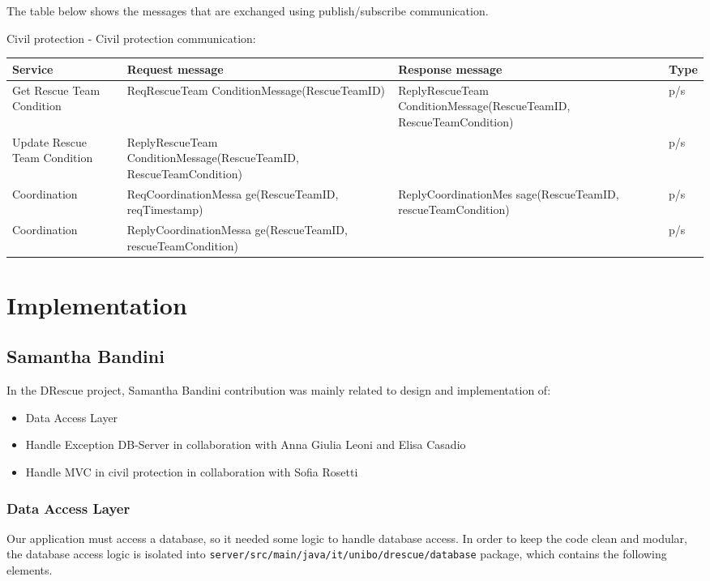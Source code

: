 \documentclass[a4paper,12pt]{report}
\begin{document}
The table below shows the messages that are exchanged using publish/subscribe communication.

Civil protection - Civil protection communication:

\begin{center}
\begin{tabular}{ |p{3.5cm}|p{4.6cm}|p{4.6cm}|p{1.3cm}| } \hline
Service 			& Request message 	& Response message		& Type 	\\
\hline
Get Rescue Team Condition	& ReqRescueTeam ConditionMessage(RescueTeamID)	& ReplyRescueTeam ConditionMessage(RescueTeamID, RescueTeamCondition) 	& p/s	\\ 
Update Rescue Team Condition	&  ReplyRescueTeam ConditionMessage(RescueTeamID, RescueTeamCondition) 	& 	& p/s	\\ 
Coordination	&  ReqCoordinationMessa ge(RescueTeamID, reqTimestamp) 	& ReplyCoordinationMes
sage(RescueTeamID, rescueTeamCondition)	& p/s	\\
Coordination	&  ReplyCoordinationMessa ge(RescueTeamID, rescueTeamCondition) 	& 	& p/s	\\
\hline
\end{tabular}
\end{center}

\chapter{Implementation}

\section{Samantha Bandini}
In the DRescue project, Samantha Bandini contribution was mainly related to design and implementation of:
\begin{itemize}
\item Data Access Layer 
\item Handle Exception DB-Server in collaboration with Anna Giulia Leoni and Elisa Casadio
\item Handle MVC in civil protection in collaboration with Sofia Rosetti
\end{itemize}

\subsection{Data Access Layer}

Our application must access a database, so it needed some logic to handle database access. In order to keep the code clean and modular, the database access logic is isolated into \texttt{server/src/main/java/it/unibo/drescue/database} package, which contains the following elements.
\end{document}
